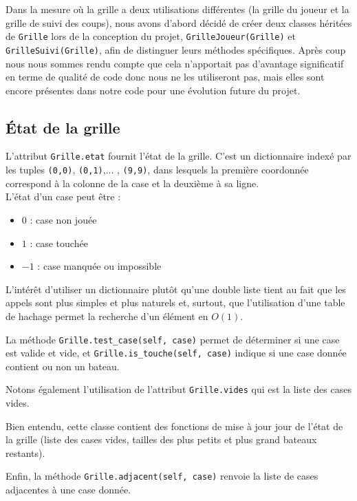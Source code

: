 Dans la mesure où la grille a deux utilisations différentes (la grille du joueur et la grille de suivi des coups), nous avons d'abord décidé de créer deux classes héritées de \texttt{Grille} lors de la conception du projet, \texttt{GrilleJoueur(Grille)} et \texttt{GrilleSuivi(Grille)}, afin de distinguer leurs méthodes spécifiques. Après coup nous nous sommes rendu compte que cela n'apportait pas d'avantage significatif en terme de qualité de code donc nous ne les utiliseront pas, mais elles sont encore présentes dans notre code pour une évolution future du projet.

\subsection{État de la grille}

L'attribut \texttt{Grille.etat} fournit l'état de la grille. C'est un dictionnaire indexé par les tuples \texttt{(0,0)}, \texttt{(0,1)},... , \texttt{(9,9)}, dans lesquels la première coordonnée correspond à la colonne de la case et la deuxième à sa ligne.\\
L'état d'un case peut être :
\begin{itemize}
\item $0$ : case non jouée
\item $1$ : case touchée
\item $-1$ : case manquée ou impossible
\end{itemize}
L'intérêt d'utiliser un dictionnaire plutôt qu'une double liste tient au fait que les appels sont plus simples et plus naturels et, surtout, que l'utilisation d'une table de hachage permet la recherche d'un élément en $O(1)$.  

La méthode \texttt{Grille.test\_case(self, case)} permet de déterminer si une case est valide et vide, et \texttt{Grille.is\_touche(self, case)} indique si une case donnée contient ou non un bateau.

Notons également l'utilisation de l'attribut \texttt{Grille.vides} qui est la liste des cases vides.

Bien entendu, cette classe contient des fonctions de mise à jour jour de l'état de la grille (liste des cases vides, tailles des plus petits et plus grand bateaux restants).

Enfin, la méthode \texttt{Grille.adjacent(self, case)} renvoie la liste de cases adjacentes à une case donnée.

